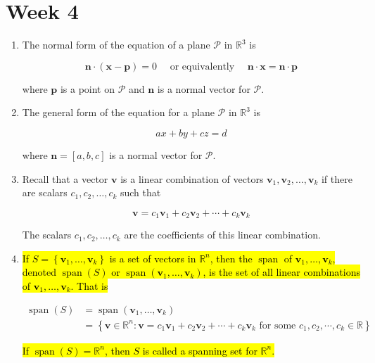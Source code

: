 \documentclass[10pt]{article}
\begin{document}
\section{Week 4}
\begin{enumerate}
\item The normal form of the equation of a plane $\mathcal{P}$ in $\mathbb{R}^{3}$ is

$$
\mathbf{n} \cdot(\mathbf{x}-\mathbf{p})=0 \quad \text { or equivalently } \quad \mathbf{n} \cdot \mathbf{x}=\mathbf{n} \cdot \mathbf{p}
$$

where $\mathbf{p}$ is a point on $\mathcal{P}$ and $\mathbf{n}$ is a normal vector for $\mathcal{P}$.

\item The general form of the equation for a plane $\mathcal{P}$ in $\mathbb{R}^{3}$ is

$$
a x+b y+c z=d
$$

where $\mathbf{n}=[a, b, c]$ is a normal vector for $\mathcal{P}$.

\item Recall that a vector $\mathbf{v}$ is a linear combination of vectors $\mathbf{v}_{1}, \mathbf{v}_{2}, \ldots, \mathbf{v}_{k}$ if there are scalars $c_{1}, c_{2}, \ldots, c_{k}$ such that

$$
\mathbf{v}=c_{1} \mathbf{v}_{1}+c_{2} \mathbf{v}_{2}+\cdots+c_{k} \mathbf{v}_{k}
$$

The scalars $c_{1}, c_{2}, \ldots, c_{k}$ are the coefficients of this linear combination.

\item \hl{If $S=\left\{\mathbf{v}_{1}, \ldots, \mathbf{v}_{k}\right\}$ is a set of vectors in $\mathbb{R}^{n}$, then the $\operatorname{span}$ of $\mathbf{v}_{1}, \ldots, \mathbf{v}_{k}$, denoted $\operatorname{span}(S)$ or $\operatorname{span}\left(\mathbf{v}_{1}, \ldots, \mathbf{v}_{k}\right)$, is the set of all linear combinations of $\mathbf{v}_{1}, \ldots, \mathbf{v}_{k}$. That is}

$$
\begin{aligned}
\operatorname{span}(S) & =\operatorname{span}\left(\mathbf{v}_{1}, \ldots, \mathbf{v}_{k}\right) \\
& =\left\{\mathbf{v} \in \mathbb{R}^{n}: \mathbf{v}=c_{1} \mathbf{v}_{1}+c_{2} \mathbf{v}_{2}+\cdots+c_{k} \mathbf{v}_{k} \text { for some } c_{1}, c_{2}, \cdots, c_{k} \in \mathbb{R}\right\}
\end{aligned}
$$

\hl{If $\operatorname{span}(S)=\mathbb{R}^{n}$, then $S$ is called a spanning set for $\mathbb{R}^{n}$.}


\end{enumerate}
\end{document}
